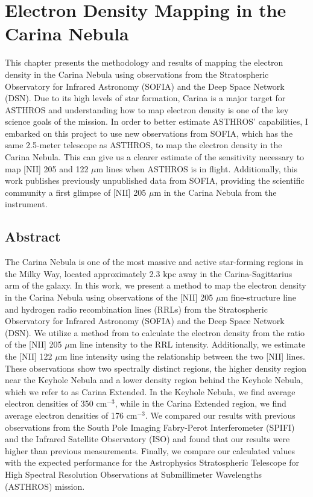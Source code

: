 \chapter[Electron Density Mapping in the Carina Nebula]{Electron Density Mapping in the Carina Nebula}
\label{ch:carina}
This chapter presents the methodology and results of mapping the electron density in the Carina Nebula using observations from the Stratospheric Observatory for Infrared Astronomy (SOFIA) and the Deep Space Network (DSN).
Due to its high levels of star formation, Carina is a major target for ASTHROS and understanding how to map electron density is one of the key science goals of the mission.
In order to better estimate ASTHROS' capabilities, I embarked on this project to use new observations from SOFIA, which has the same 2.5-meter telescope as ASTHROS, to map the electron density in the Carina Nebula.
This can give us a clearer estimate of the sensitivity necessary to map [NII] 205 and 122 $\mu$m lines when ASTHROS is in flight. 
Additionally, this work publishes previously unpublished data from SOFIA, providing the scientific community a first glimpse of [NII] 205 $\mu$m in the Carina Nebula from the instrument. 

\section{Abstract}
The Carina Nebula is one of the most massive and active star-forming regions in the Milky Way, located approximately 2.3 kpc away in the Carina-Sagittarius arm of the galaxy.
In this work, we present a method to map the electron density in the Carina Nebula using observations of the [NII] 205 $\mu$m fine-structure line and hydrogen radio recombination lines (RRLs) from the Stratospheric Observatory for Infrared Astronomy (SOFIA) and the Deep Space Network (DSN).
We utilize a method from \cite{pineda2019electron} to calculate the electron density from the ratio of the [NII] 205 $\mu$m line intensity to the RRL intensity.
Additionally, we estimate the [NII] 122 $\mu$m line intensity using the relationship between the two [NII] lines.
These observations show two spectrally distinct regions, the higher density region near the Keyhole Nebula and a lower density region behind the Keyhole Nebula, which we refer to as Carina Extended.
In the Keyhole Nebula, we find average electron densities of 350 cm$^{-3}$, while in the Carina Extended region, we find average electron densities of 176 cm$^{-3}$.
We compared our results with previous observations from the South Pole Imaging Fabry-Perot Interferometer (SPIFI) and the Infrared Satellite Observatory (ISO) and found that our results were higher than previous measurements.
Finally, we compare our calculated values with the expected performance for the Astrophysics Stratospheric Telescope for High Spectral Resolution Observations at Submillimeter Wavelengths (ASTHROS) mission.

